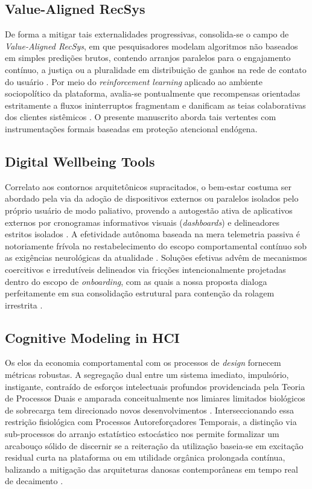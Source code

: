 \subsection{Value-Aligned RecSys}
De forma a mitigar tais externalidades progressivas, consolida-se o campo de \textit{Value-Aligned RecSys}, em que pesquisadores modelam algoritmos não baseados em simples predições brutos, contendo arranjos paralelos para o engajamento contínuo, a justiça ou a pluralidade em distribuição de ganhos na rede de contato do usuário \citep{stray2021}. Por meio do \textit{reinforcement learning} aplicado ao ambiente sociopolítico da plataforma, avalia-se pontualmente que recompensas orientadas estritamente a fluxos ininterruptos fragmentam e danificam as teias colaborativas dos clientes sistêmicos \citep{carvalho2023}. O presente manuscrito aborda tais vertentes com instrumentações formais baseadas em proteção atencional endógena.

\subsection{Digital Wellbeing Tools}
Correlato aos contornos arquitetônicos supracitados, o bem-estar costuma ser abordado pela via da adoção de dispositivos externos ou paralelos isolados pelo próprio usuário de modo paliativo, provendo a autogestão ativa de aplicativos externos por cronogramas informativos visuais (\textit{dashboards}) e delineadores estritos isolados \citep{forest, rescuetime}. A efetividade autônoma baseada na mera telemetria passiva é notoriamente frívola no restabelecimento do escopo comportamental contínuo sob as exigências neurológicas da atualidade \citep{lyngs2019}. Soluções efetivas advêm de mecanismos coercitivos e irredutíveis delineados via fricções intencionalmente projetadas dentro do escopo de \textit{onboarding}, com as quais a nossa proposta dialoga perfeitamente em sua consolidação estrutural para contenção da rolagem irrestrita \citep{kushlev2022}.

\subsection{Cognitive Modeling in HCI}
Os elos da economia comportamental com os processos de \textit{design} fornecem métricas robustas. A segregação dual entre um sistema imediato, impulsório, instigante, contraído de esforços intelectuais profundos providenciada pela Teoria de Processos Duais e amparada conceitualmente nos limiares limitados biológicos de sobrecarga tem direcionado novos desenvolvimentos \citep{kahneman2011, paas2023}. Interseccionando essa restrição fisiológica com Processos Autoreforçadores Temporais, a distinção via sub-processos do arranjo estatístico estocástico nos permite formalizar um arcabouço sólido de discernir se a reiteração da utilização baseia-se em excitação residual curta na plataforma ou em utilidade orgânica prolongada contínua, balizando a mitigação das arquiteturas danosas contemporâneas em tempo real de decaimento \citep{agarwal2024, rizoiu2017}.

